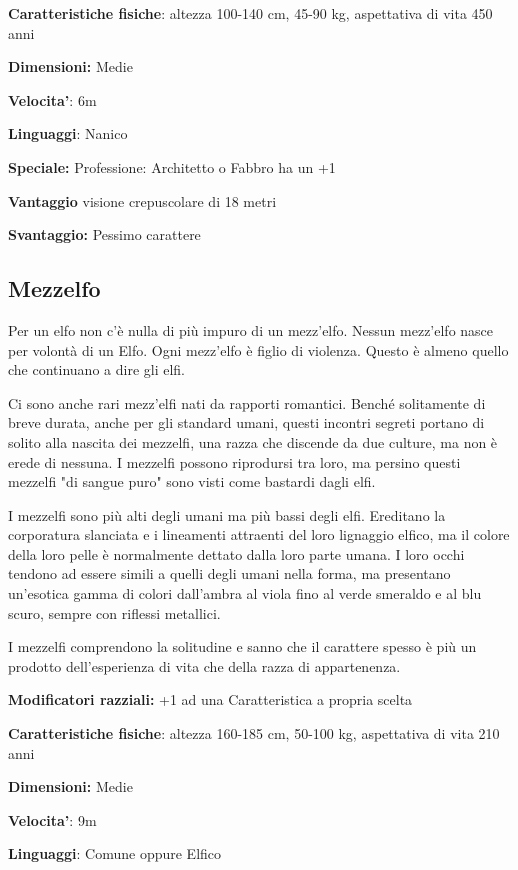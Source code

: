 \documentclass[a4paper,11pt,twoside,openany]{book}
\begin{document}
\textbf{Caratteristiche fisiche}: altezza 100-140 cm, 45-90 kg, aspettativa
di vita 450 anni

\textbf{Dimensioni:} Medie

\textbf{Velocita'}: 6m

\textbf{Linguaggi}: Nanico

\textbf{Speciale:} Professione: Architetto o Fabbro ha un +1

\textbf{Vantaggio} visione crepuscolare di 18 metri

\textbf{Svantaggio:} Pessimo carattere

\subsection{Mezzelfo}

\label{mezzelfo}

Per un elfo non c'è nulla di più impuro di un mezz'elfo. Nessun mezz'elfo nasce per volontà di un Elfo. Ogni mezz'elfo è figlio di violenza. Questo è almeno quello che continuano a dire gli elfi.

Ci sono anche rari mezz'elfi nati da rapporti romantici. Benché solitamente di breve durata, anche per gli standard umani, questi incontri segreti portano di solito alla nascita dei mezzelfi, una razza che discende da due culture, ma non è erede di nessuna. I mezzelfi possono riprodursi tra loro, ma persino questi mezzelfi "di sangue puro" sono visti come bastardi dagli elfi.

I mezzelfi sono più alti degli umani ma più bassi degli elfi. Ereditano la corporatura slanciata e i lineamenti attraenti del loro lignaggio elfico, ma il colore della loro pelle è normalmente dettato dalla loro parte umana. I loro occhi tendono ad essere simili a quelli degli umani nella forma, ma presentano un'esotica gamma di colori dall'ambra al viola fino al verde smeraldo e al blu scuro, sempre con riflessi metallici.

I mezzelfi comprendono la solitudine e sanno che il carattere spesso è più un prodotto dell'esperienza di vita che della razza di appartenenza.

\textbf{Modificatori razziali:} +1 ad una Caratteristica a propria
scelta

\textbf{Caratteristiche fisiche}: altezza 160-185 cm, 50-100 kg, aspettativa di vita 210 anni

\textbf{Dimensioni:} Medie

\textbf{Velocita'}: 9m

\textbf{Linguaggi}: Comune oppure Elfico
\end{document}
